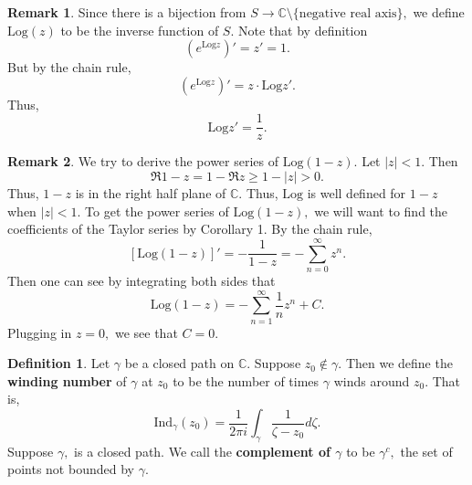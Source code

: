 \documentclass[10pt, oneside]{article}
\newcommand{\bbC}{\mathbb{C}}
\newcommand{\Ind}{\text{Ind}}
\newcommand{\sm}{\setminus}
\theoremstyle{definition}
\newtheorem{defn}{Definition}
\newtheorem{rem}{Remark}
\newcommand{\bbC}{\mathbb{C}}
\newcommand{\sm}{\setminus}
\begin{document}
\begin{rem}
    Since there is a bijection from $S \to \bbC\sm\{\text{negative real axis}\},$ we define $\text{Log}(z)$ to be the inverse function of $S.$ Note that by definition
    \[\left(e^{\text{Log}z}\right)' = z' = 1.\] But by the chain rule,
    \[\left(e^{\text{Log}z}\right)' = z \cdot {\text{Log}z}'.\] Thus, 
    \[{\text{Log}z}' = \frac{1}{z}.\]
\end{rem}
\begin{rem}
    We try to derive the power series of $\text{Log}(1-z).$ Let $|z| < 1.$ Then 
    \[\Re{1-z}  = 1 - \Re{z} \geq 1 - |z| >0 .\] Thus, $1-z$ is in the right half plane of $\bbC.$ Thus, $\text{Log}$ is well defined for $1-z$ when $|z| < 1.$ To get the power series of $\text{Log}(1-z),$ we will want to find the coefficients of the Taylor series by Corollary 1. By the chain rule, 
    \[[\text{Log}(1-z)]' = - \frac{1}{1-z} = -\sum_{n=0}^\infty z^n.\] Then one can see by integrating both sides that
    \[\text{Log}(1-z) = - \sum_{n=1}^\infty \frac{1}{n}z^n  + C.\] Plugging in $z = 0,$ we see that $C = 0. $
\end{rem}
\begin{defn}
    Let $\gamma$ be a closed path on $\bbC.$ Suppose $z_0 \notin \gamma.$ Then we define the \textbf{winding number} of $\gamma$ at $z_0$ to be the number of times $\gamma$ winds around $z_0.$ That is,
    \[\Ind_\gamma(z_0) = \frac{1}{2\pi i}\int_\gamma\frac{1}{\zeta - z_0}d\zeta.\] Suppose $\gamma,$ is a closed path. We call the \textbf{complement of  $\gamma$} to be $\gamma^c,$ the set of points not bounded by $\gamma.$

\end{defn}
\end{document}
